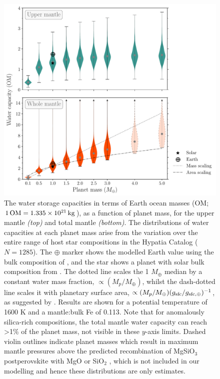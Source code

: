 \documentclass[fleqn,usenatbib]{mnras}
\begin{document}
\begin{figure}
\centering
  \includegraphics[width=0.9\linewidth]{viol-Mp.pdf}
\caption{The water storage capacities in terms of Earth ocean masses (OM; $1\,{\rm OM} = 1.335 \times 10^{21}\, {\rm kg}$), as a function of planet mass, for the upper mantle \textit{(top)} and total mantle \textit{(bottom)}. The distributions of water capacities at each planet mass arise from the variation over the entire range of host star compositions in the Hypatia Catalog ($N = 1285$). The $\oplus$ marker shows the modelled Earth value using the bulk composition of \citet{mcdonough_composition_1995}, and the star shows a planet with solar bulk composition from \citet{lodders_abundances_2009}. The dotted line scales the 1 $M_\oplus$ median by a constant water mass fraction, $\propto (M_p / M_\oplus)$, whilst the dash-dotted line scales it with planetary surface area, $\propto (M_p / M_\oplus) (g_{\rm sfc}/g_{{\rm sfc}, \oplus})^{-1}$, as suggested by \citet{cowan_water_2014}. Results are shown for a potential temperature of 1600 K and a mantle:bulk Fe of 0.113. Note that for anomalously silica-rich compositions, the total mantle water capacity can reach \textgreater1\% of the planet mass, not visible in these $y$-axis limits. Dashed violin outlines indicate planet masses which result in maximum mantle pressures above the predicted recombination of MgSiO$_3$ postperovskite with MgO or SiO$_2$ \citep{umemoto_phase_2017}, which is not included in our modelling and hence these distributions are only estimates.}
\label{fig:violin_masses}
\end{figure}
\end{document}
